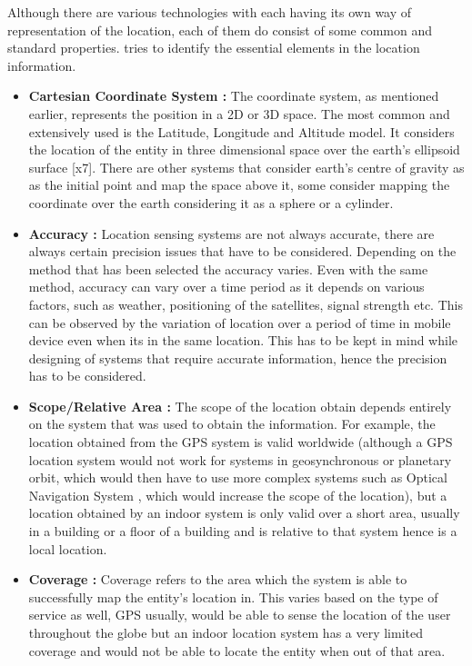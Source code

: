 \documentclass[12pt]{report}
\begin{document}
Although there are various technologies with each having its own way of representation of the location, each of them do consist of some common and standard properties. \cite{schiller2004location} tries to identify the essential elements in the location information.

\begin{itemize}
\item \textbf{Cartesian Coordinate System :} The coordinate system, as mentioned earlier, represents the position in a 2D or 3D space. The most common and extensively used is the Latitude, Longitude and Altitude model. It considers the location of the entity in three dimensional space over the earth's ellipsoid surface [x7].  There are other systems that consider earth's centre of gravity as as the initial point and map the space above it, some consider mapping the coordinate over the earth considering it as a sphere or a cylinder.

\item \textbf{Accuracy :} Location sensing systems are not always accurate, there are always certain precision issues that have to be considered. Depending on the method that has been selected the accuracy varies. Even with the same method, accuracy can vary over a time period as it depends on various factors, such as weather, positioning of the satellites, signal strength etc. This can be observed by the variation of location over a period of time in mobile device even when its in the same location. This has to be kept in mind while designing of systems that require accurate information, hence the precision has to be considered.

\item \textbf{Scope/Relative Area :} The scope of the location obtain depends entirely on the system that was used to obtain the information. For example, the location obtained from the GPS system is valid worldwide (although a GPS location system would not work for systems in geosynchronous or planetary orbit, which would then have to use more complex systems such as Optical Navigation System \cite{rathbone1988optical}, which would increase the scope of the location), but a location obtained by an indoor system is only valid over a short area, usually in a building or a floor of a building and is relative to that system hence is a local location.


\item \textbf{Coverage :} Coverage refers to the area which the system is able to successfully map the entity's location in. This varies based on the type of service as well, GPS usually, would be able to sense the location of the user throughout the globe but an indoor location system has a very limited coverage and would not be able to locate the entity when out of that area.
\end{itemize}
\end{document}

